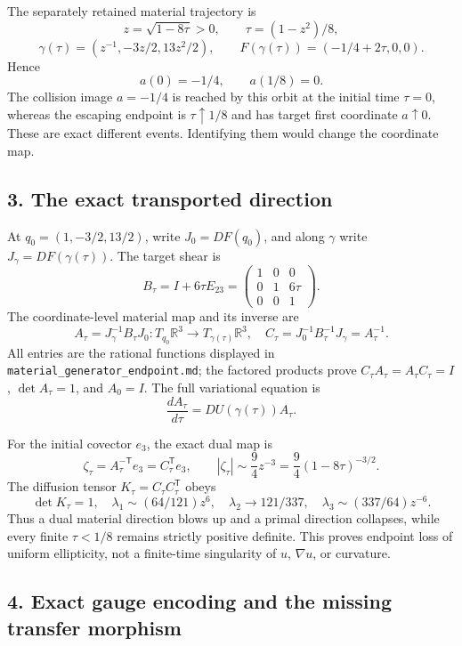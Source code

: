 The separately retained material trajectory is \[
z=\sqrt{1-8\tau}>0,\qquad \tau=(1-z^2)/8,
\] \[
\gamma(\tau)=(z^{-1},-3z/2,13z^2/2),\qquad F(\gamma(\tau))=(-1/4+2\tau,0,0).
\] Hence \[
a(0)=-1/4,\qquad a(1/8)=0.
\] The collision image \(a=-1/4\) is reached by this orbit at the
initial time \(\tau=0\), whereas the escaping endpoint is
\(\tau\uparrow1/8\) and has target first coordinate \(a\uparrow0\).
These are exact different events. Identifying them would change the
coordinate map.

\subsection{3. The exact transported
direction}\label{fabel-jacobi-to-ym-coordinate-audit-md-the-exact-transported-direction}

At \(q_0=(1,-3/2,13/2)\), write \(J_0=DF(q_0)\), and along \(\gamma\)
write \(J_\gamma=DF(\gamma(\tau))\). The target shear is \[
B_\tau=I+6\tau E_{23}=\begin{pmatrix}1&0&0\\0&1&6\tau\\0&0&1\end{pmatrix}.
\] The coordinate-level material map and its inverse are \[
A_\tau=J_\gamma^{-1}B_\tau J_0:T_{q_0}\mathbb R^3\to T_{\gamma(\tau)}\mathbb R^3,
\quad
C_\tau=J_0^{-1}B_\tau^{-1}J_\gamma=A_\tau^{-1}.
\] All entries are the rational functions displayed in
\texttt{material\_generator\_endpoint.md}; the factored products prove
\(C_\tau A_\tau=A_\tau C_\tau=I\), \(\det A_\tau=1\), and \(A_0=I\). The
full variational equation is \[
\frac{dA_\tau}{d\tau}=DU(\gamma(\tau))A_\tau.
\]

For the initial covector \(e_3\), the exact dual map is \[
\zeta_\tau=A_\tau^{-\mathsf T}e_3=C_\tau^{\mathsf T}e_3,
\qquad |\zeta_\tau|\sim\frac94 z^{-3}=\frac94(1-8\tau)^{-3/2}.
\] The diffusion tensor \(K_\tau=C_\tau C_\tau^{\mathsf T}\) obeys \[
\det K_\tau=1,\quad \lambda_1\sim(64/121)z^6,\quad
\lambda_2\to121/337,\quad \lambda_3\sim(337/64)z^{-6}.
\] Thus a dual material direction blows up and a primal direction
collapses, while every finite \(\tau<1/8\) remains strictly positive
definite. This proves endpoint loss of uniform ellipticity, not a
finite-time singularity of \(u\), \(\nabla u\), or curvature.

\subsection{4. Exact gauge encoding and the missing transfer
morphism}\label{fabel-jacobi-to-ym-coordinate-audit-md-exact-gauge-encoding-and-the-missing-transfer-morphism}

